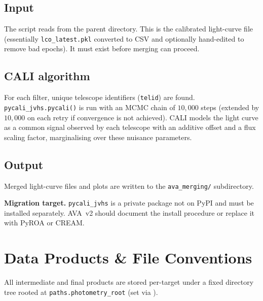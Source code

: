 \documentclass[12pt,a4paper]{article}
\begin{document}
\subsection{Input}

The script reads  from the parent directory.  This is the
calibrated light-curve file (essentially \texttt{lco\_latest.pkl} converted to CSV and
optionally hand-edited to remove bad epochs).  It must exist before merging can proceed.

\subsection{CALI algorithm}

For each filter, unique telescope identifiers (\texttt{telid}) are found.
\texttt{pycali\_\hspace{0pt}jvhs.pycali()} is run with an MCMC chain of $10{,}000$ steps (extended
by $10{,}000$ on each retry if convergence is not achieved).  CALI models the light curve
as a common signal observed by each telescope with an additive offset and a flux scaling
factor, marginalising over these nuisance parameters.

\subsection{Output}

Merged light-curve files and plots are written to the \texttt{ava\_merging/} subdirectory.

\begin{warnbox}
\textbf{Migration target.}  \texttt{pycali\_jvhs} is a private package not on PyPI and
must be installed separately.  AVA~v2 should document the install procedure or replace
it with PyROA or CREAM.
\end{warnbox}

\section{Data Products \& File Conventions}
\label{sec:products}

All intermediate and final products are stored per-target under a fixed directory tree
rooted at \texttt{paths.photometry\_root} (set via ).
\end{document}

